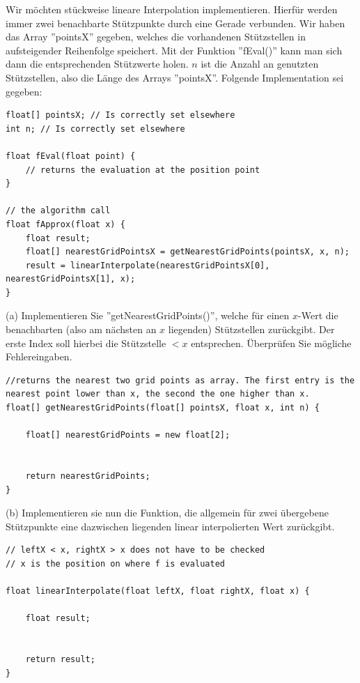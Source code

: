 \documentclass{scrartcl}
\begin{document}

	Wir möchten stückweise lineare Interpolation implementieren. Hierfür werden immer zwei benachbarte Stützpunkte durch eine Gerade verbunden. 
	\n 
	Wir haben das Array ''pointsX'' gegeben, welches die vorhandenen Stützstellen in aufsteigender Reihenfolge speichert. Mit der Funktion ''fEval()'' kann man sich dann die entsprechenden Stützwerte holen. $n$ ist die Anzahl an genutzten Stützstellen, also die Länge des Arrays ''pointsX''.
	\n
	Folgende Implementation sei gegeben:
	\begin{lstlisting}
float[] pointsX; // Is correctly set elsewhere
int n; // Is correctly set elsewhere
	
float fEval(float point) {
	// returns the evaluation at the position point
}
	
// the algorithm call
float fApprox(float x) {
	float result;
	float[] nearestGridPointsX = getNearestGridPoints(pointsX, x, n);
	result = linearInterpolate(nearestGridPointsX[0], nearestGridPointsX[1], x);
}	
	\end{lstlisting}
	(a) Implementieren Sie ''getNearestGridPoints()'', welche für einen $x$-Wert die benachbarten (also am nächsten an $x$ liegenden) Stützstellen zurückgibt. Der erste Index soll hierbei die Stützstelle $< x$ entsprechen. 
	\n 
	Überprüfen Sie mögliche Fehlereingaben.
	\begin{lstlisting}
//returns the nearest two grid points as array. The first entry is the nearest point lower than x, the second the one higher than x.
float[] getNearestGridPoints(float[] pointsX, float x, int n) {
	
	float[] nearestGridPoints = new float[2];
		
		
	return nearestGridPoints;
}
	\end{lstlisting}
	\newpage
	(b) Implementieren sie nun die Funktion, die allgemein für zwei übergebene Stützpunkte eine dazwischen liegenden linear interpolierten Wert zurückgibt.
	\begin{lstlisting}
// leftX < x, rightX > x does not have to be checked
// x is the position on where f is evaluated
	
float linearInterpolate(float leftX, float rightX, float x) {
	
	float result;
	
	
	return result;
}
	\end{lstlisting}
\end{document}
